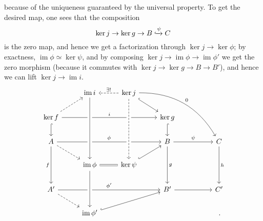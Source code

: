 \begin{ex}
    because of the uniqueness guaranteed by the universal property.
    To get the desired map, one sees that the composition
    \begin{equation*}
        \ker j \to \ker g \to B \xhookrightarrow{\psi} C
    \end{equation*}
    is the zero map, and hence we get a factorization through
    $\ker j \to \ker \phi$; by exactness, 
    $\operatorname{im} \phi \simeq \ker \psi$, and by composing
    $\ker j \to \operatorname{im} \phi \to \operatorname{im}\phi'$
    we get the zero morphism (because it commutes with $\ker j \to \ker g \to B \to B'$), and hence we can lift $\ker j \to \operatorname{im} i$.
    \begin{equation*}
\begin{tikzcd}
                                                         &   \operatorname{im} i                                                               & \ker j \arrow[rd, hook] \arrow[rrrdd, "0", bend left] \arrow[ddd, dashed, crossing over] \ar[l, "\exists !"', dashed] &                                      &  &                   \\
\ker f \arrow[d, hook] \arrow[rrr, "i"] \ar[ru, dashed]                 &                                                                 &                                                                           & \ker g \arrow[d, hook]               &  &                   \\
A \arrow[rrr, "\phi"] \arrow[rd, dashed] \arrow[dd, "f"'] &                                                                 &                                                                           & B \arrow[rr, "\psi"] \arrow[dd, "g"] &  & C \arrow[dd, "h"] \\
                                                         & \operatorname{im}\phi \ar[from=uuu, crossing over] \arrow[r, no head, equals] & \ker \psi \arrow[ru, hook] \arrow[from=uuu, dashed, crossing over]                                              &                                      &  &                   \\
A' \arrow[rrr, "\phi'"]  \arrow[rd, dashed]               &                                                                 &                                                                           & B' \arrow[rr]                        &  & C'                \\
                                                         & \operatorname{im}\phi' \arrow[rru, hook]   \arrow[from=uu, crossing over]                     &                                                                           &                                      &  &        \,.          
\end{tikzcd}
    \end{equation*}


\end{ex}
